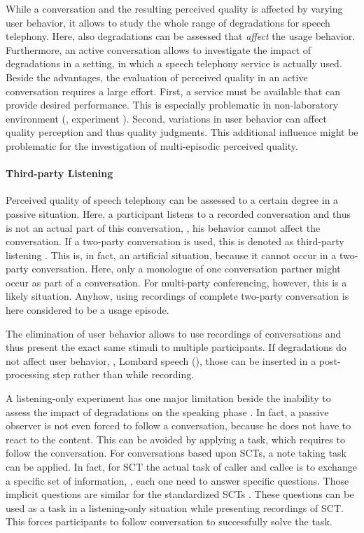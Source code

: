 While a conversation and the resulting perceived quality is affected by varying user behavior, it allows to study the whole range of degradations for speech telephony.
Here, also degradations can be assessed that \emph{affect} the usage behavior. %
Furthermore, an active conversation allows to investigate the impact of degradations in a setting, in which a speech telephony service is actually used.
Beside the advantages, the evaluation of perceived quality in an active conversation requires a large effort.
First, a service must be available that can provide desired performance.
This is especially problematic in non-laboratory environment (\cf, experiment ).
Second, variations in user behavior can affect quality perception and thus quality judgments.
This additional influence might be problematic for the investigation of multi-episodic perceived quality.

\paragraph*{Third-party Listening}
Perceived quality of speech telephony can be assessed  to a certain degree in a passive situation.
Here, a participant listens to a recorded conversation and thus is not an actual part of this conversation, \ie, his behavior cannot affect the conversation.
If a two-party conversation is used, this is denoted as third-party listening \citep[][p.~13]{itu-t_p.832:_2000}.
This is, in fact, an artificial situation, because it cannot occur in a two-party conversation.
Here, only a monologue of one conversation partner might occur as part of a conversation.
For multi-party conferencing, however, this is a likely situation.
Anyhow, using recordings of complete two-party conversation is here considered to be a usage episode.

The elimination of user behavior allows to use recordings of conversations and thus present the exact same stimuli to multiple participants.
If degradations do not affect user behavior, \eg, Lombard speech (\citep[][p.~161]{moller_assessment_2000}), those can be inserted in a post-processing step rather than while recording.

A listening-only experiment has one major limitation beside the inability to assess the impact of degradations on the speaking phase \citep{gueguin_evaluation_2008}.
In fact, a passive observer is not even forced to follow a conversation, because he does not have to react to the content.
This can be avoided by applying a task, which requires to follow the conversation.
For conversations based upon \acp{SCT}, a note taking task can be applied.
In fact, for \ac{SCT} the actual task of caller and callee is to exchange a specific set of information, \ie, each one need to answer specific questions.
Those implicit questions are similar for the standardized \acp{SCT} \citep{itu-t_p.805:_2007}.
These questions can be used as a task in a listening-only situation while presenting recordings of \ac{SCT}.
This forces participants to follow conversation to successfully solve the task.

